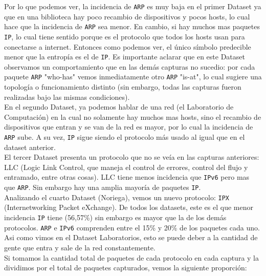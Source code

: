 Por lo que podemos ver, la incidencia de \texttt{ARP} es muy baja en el primer Dataset ya que en una biblioteca hay poco recambio de dispositivos y pocos hosts, lo cual hace que la incidencia de \texttt{ARP} sea menor. En cambio, si hay muchos mas paquetes \texttt{IP}, lo cual tiene sentido porque es el protocolo que todos los hosts usan para conectarse a internet. Entonces como podemos ver, el único símbolo predecible menor que la entropía es el de \texttt{IP}. Es importante aclarar que en este Dataset observamos un comportamiento que en las demás capturas no sucedio: por cada paquete \texttt{ARP} "who-has" vemos inmediatamente otro \texttt{ARP} "is-at", lo cual sugiere una topología o funcionamiento distinto (sin embargo, todas las capturas fueron realizadas bajo las mismas condiciones).\\


En el segundo Dataset, ya podemos hablar de una red (el Laboratorio de Computación) en la cual no solamente hay muchos mas hosts, sino el recambio de dispositivos que entran y se van de la red es mayor, por lo cual la incidencia de \texttt{ARP} sube. A su vez, \texttt{IP} sigue siendo el protocolo más usado al igual que en el dataset anterior. \\

El tercer Dataset presenta un protocolo que no se veía en las capturas anteriores: LLC (Logic Link Control, que maneja el control de errores, control del flujo y entramado, entre otras cosas). LLC tiene menos incidencia que \texttt{IPv6} pero mas que \texttt{ARP}. Sin embargo hay una amplia mayoría de paquetes \texttt{IP}. \\

Analizando el cuarto Dataset (Noriega), vemos un nuevo protocolo: \texttt{IPX} (Internetworking Packet eXchange). De todos los datasets, este es el que menor incidencia \texttt{IP} tiene (56,57\%) sin embargo es mayor que la de los demás protocolos. \texttt{ARP} e \texttt{IPv6} comprenden entre el 15\% y 20\% de los paquetes cada uno. Asi como vimos en el Dataset Laboratorios, esto se puede deber a la cantidad de gente que entra y sale de la red constantemente. \\

Si tomamos la cantidad total de paquetes de cada protocolo en cada captura y la dividimos por el total de paquetes capturados, vemos la siguiente proporción: \\


